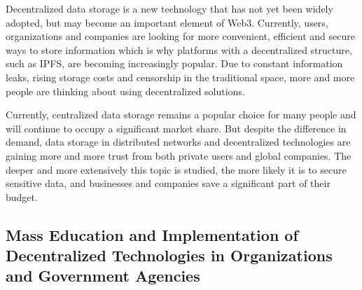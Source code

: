 \documentclass[10pt,conference,a4paper]{IEEEtran_EDM}
\begin{document}
Decentralized data storage is a new technology that has not yet been widely adopted, but may become an important element of Web3.
Currently, users, organizations and companies are looking for more convenient, efficient and secure ways to store information which is why platforms with a decentralized structure, such as IPFS, are becoming increasingly popular.
Due to constant information leaks, rising storage costs and censorship in the traditional space, more and more people are thinking
about using decentralized solutions.

Currently, centralized data storage remains a popular choice for many people and will continue to occupy a significant market share.
But despite the difference in demand, data storage in distributed networks and decentralized technologies are gaining more and more trust from both private users and global companies. The deeper and more extensively this topic is studied, the more likely it is to secure sensitive data, and businesses and companies save a significant part of their budget.

\subsection{Mass Education and Implementation of Decentralized Technologies in Organizations and Government Agencies }
\end{document}
